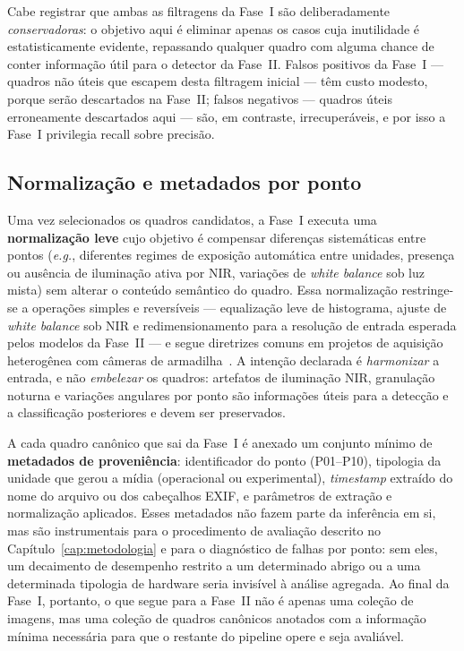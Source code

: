 Cabe registrar que ambas as filtragens da Fase~I são deliberadamente \emph{conservadoras}: o objetivo aqui é eliminar apenas os casos cuja inutilidade é estatisticamente evidente, repassando qualquer quadro com alguma chance de conter informação útil para o detector da Fase~II. Falsos positivos da Fase~I --- quadros não úteis que escapem desta filtragem inicial --- têm custo modesto, porque serão descartados na Fase~II; falsos negativos --- quadros úteis erroneamente descartados aqui --- são, em contraste, irrecuperáveis, e por isso a Fase~I privilegia recall sobre precisão.

\subsection*{Normalização e metadados por ponto}

Uma vez selecionados os quadros candidatos, a Fase~I executa uma \textbf{normalização leve} cujo objetivo é compensar diferenças sistemáticas entre pontos (\emph{e.g.}, diferentes regimes de exposição automática entre unidades, presença ou ausência de iluminação ativa por NIR, variações de \emph{white balance} sob luz mista) sem alterar o conteúdo semântico do quadro. Essa normalização restringe-se a operações simples e reversíveis --- equalização leve de histograma, ajuste de \emph{white balance} sob NIR e redimensionamento para a resolução de entrada esperada pelos modelos da Fase~II --- e segue diretrizes comuns em projetos de aquisição heterogênea com câmeras de armadilha~\cite{velez2022choosing,velasco2024smartcameratraps}. A intenção declarada é \emph{harmonizar} a entrada, e não \emph{embelezar} os quadros: artefatos de iluminação NIR, granulação noturna e variações angulares por ponto são informações úteis para a detecção e a classificação posteriores e devem ser preservados.

A cada quadro canônico que sai da Fase~I é anexado um conjunto mínimo de \textbf{metadados de proveniência}: identificador do ponto (P01--P10), tipologia da unidade que gerou a mídia (operacional ou experimental), \emph{timestamp} extraído do nome do arquivo ou dos cabeçalhos EXIF, e parâmetros de extração e normalização aplicados. Esses metadados não fazem parte da inferência em si, mas são instrumentais para o procedimento de avaliação descrito no Capítulo~\ref{cap:metodologia} e para o diagnóstico de falhas por ponto: sem eles, um decaimento de desempenho restrito a um determinado abrigo ou a uma determinada tipologia de hardware seria invisível à análise agregada. Ao final da Fase~I, portanto, o que segue para a Fase~II não é apenas uma coleção de imagens, mas uma coleção de quadros canônicos anotados com a informação mínima necessária para que o restante do pipeline opere e seja avaliável.
